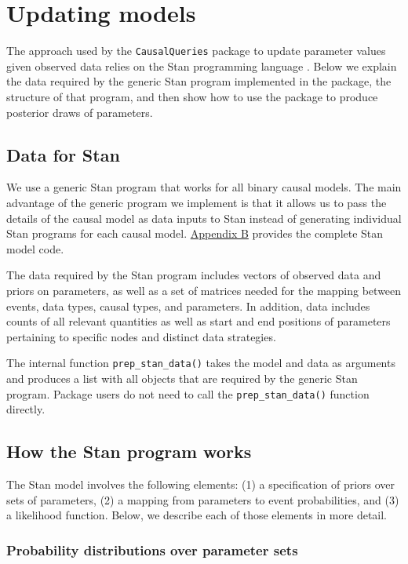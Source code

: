 \documentclass[
  11pt,
  article]{jss}
\begin{document}
\section{Updating models}\label{sec-update}

The approach used by the \texttt{CausalQueries} package to update
parameter values given observed data relies on the Stan programming
language \citep{carpenter_stan_2017}. Below we explain the data required
by the generic Stan program implemented in the package, the structure of
that program, and then show how to use the package to produce posterior
draws of parameters.

\subsection{Data for Stan}\label{data-for-stan}

We use a generic Stan program that works for all binary causal models.
The main advantage of the generic program we implement is that it allows
us to pass the details of the causal model as data inputs to Stan
instead of generating individual Stan programs for each causal model.
\hyperref[sec-stancode]{Appendix B} provides the complete Stan model
code.

The data required by the Stan program includes vectors of observed data
and priors on parameters, as well as a set of matrices needed for the
mapping between events, data types, causal types, and parameters. In
addition, data includes counts of all relevant quantities as well as
start and end positions of parameters pertaining to specific nodes and
distinct data strategies.

The internal function \texttt{prep\_stan\_data()} takes the model and
data as arguments and produces a list with all objects that are required
by the generic Stan program. Package users do not need to call the
\texttt{prep\_stan\_data()} function directly.

\subsection{How the Stan program
works}\label{how-the-stan-program-works}

The Stan model involves the following elements: (1) a specification of
priors over sets of parameters, (2) a mapping from parameters to event
probabilities, and (3) a likelihood function. Below, we describe each of
those elements in more detail.

\subsubsection{Probability distributions over parameter
sets}\label{probability-distributions-over-parameter-sets}
\end{document}
